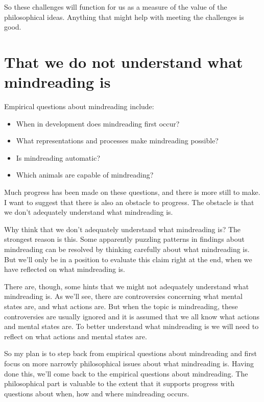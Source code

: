 \documentclass[12pt,\papersize]{extarticle}
\begin{document}
So these challenges will function for us as a measure of the value of the philosophical ideas.
Anything that might help with meeting the challenges is good.



\section{That we do not understand what mindreading is}
Empirical questions about mindreading include:
\begin{itemize}
\item When in development does mindreading first occur?
\item What representations and processes make mindreading possible?
\item Is mindreading automatic?
\item Which animals are capable of mindreading?
\end{itemize}
%
Much progress has been made on these questions, and there is more still to make. 
I want to suggest that there is also an obstacle to progress.
The obstacle is that we don't adequately understand what mindreading is. 

Why think that we don't adequately understand what mindreading is? 
The strongest reason is this.
Some apparently puzzling patterns in findings about mindreading can be resolved by thinking carefully about what mindreading is. 
But we'll only be in a position to evaluate this claim right at the end, when we have reflected on what mindreading is.

There are, though, some hints that we might not adequately understand what mindreading is.
As we'll see, there are controversies concerning what mental states are, and what actions are.  
But when the topic is mindreading, these controversies are usually ignored and it is assumed that we all know what actions and mental states are. 
To better understand what mindreading is we will need to reflect on what actions and mental states are.

So my plan is to step back from empirical questions about mindreading and first focus on more narrowly philosophical issues about what mindreading is.
Having done this, we'll come back to the empirical questions about mindreading.  
The philosophical part is valuable to the extent that it supports progress with questions about when, how and where mindreading occurs.
\end{document}
